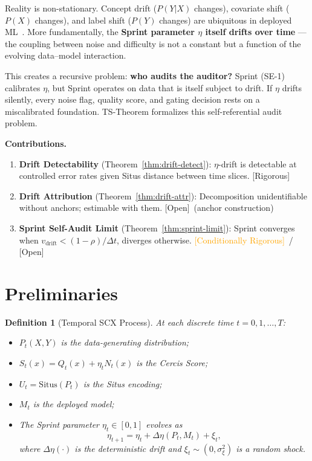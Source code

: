 \documentclass[12pt,a4paper]{article}
\newtheorem{definition}[theorem]{Definition}
\newcommand{\rigorous}{\textcolor{green!50!black}{\small\textsf{[Rigorous]}}}
\newcommand{\conditionallyrigorous}{\textcolor{orange}{\small\textsf{[Conditionally Rigorous]}}}
\newcommand{\openquest}{\textcolor{red!70!black}{\small\textsf{[Open]}}}
\newcommand{\Situs}{\mathrm{Situs}}
\begin{document}
Reality is non-stationary.  Concept drift ($P(Y|X)$ changes), covariate
shift ($P(X)$ changes), and label shift ($P(Y)$ changes) are ubiquitous in
deployed ML~\citep{gama2014survey, lu2018learning}.  More fundamentally,
the \textbf{Sprint parameter $\eta$ itself drifts over time} --- the coupling
between noise and difficulty is not a constant but a function of the
evolving data--model interaction.

This creates a recursive problem: \textbf{who audits the auditor?}  Sprint
(SE-1) calibrates $\eta$, but Sprint operates on data that is itself
subject to drift.  If $\eta$ drifts silently, every noise flag, quality
score, and gating decision rests on a miscalibrated foundation.  TS-Theorem
formalizes this self-referential audit problem.

\medskip\noindent
\textbf{Contributions.}
\begin{enumerate}[label=(\arabic*)]
    \item \textbf{Drift Detectability} (Theorem~\ref{thm:drift-detect}):
          $\eta$-drift is detectable at controlled error rates given Situs
          distance between time slices.  \rigorous
    \item \textbf{Drift Attribution} (Theorem~\ref{thm:drift-attr}):
          Decomposition unidentifiable without anchors; estimable with them.
          \openquest~(anchor construction)
    \item \textbf{Sprint Self-Audit Limit} (Theorem~\ref{thm:sprint-limit}):
          Sprint converges when $v_{\mathrm{drift}} < (1-\rho)/\Delta t$,
          diverges otherwise.  \conditionallyrigorous~/ \openquest
\end{enumerate}

\section{Preliminaries}

\begin{definition}[Temporal SCX Process]
\label{def:temporal}
At each discrete time $t = 0, 1, \dots, T$:
\begin{itemize}
    \item $P_t(X,Y)$ is the data-generating distribution;
    \item $S_t(x) = Q_t(x) + \eta_t N_t(x)$ is the Cercis Score;
    \item $U_t = \Situs(P_t)$ is the Situs encoding;
    \item $M_t$ is the deployed model;
    \item The Sprint parameter $\eta_t \in [0,1]$ evolves as
          \begin{equation}\label{eq:eta-evolution}
              \eta_{t+1} = \eta_t + \Delta\eta(P_t, M_t) + \xi_t,
          \end{equation}
          where $\Delta\eta(\cdot)$ is the deterministic drift and
          $\xi_t \sim (0, \sigma^2_\xi)$ is a random shock.
\end{itemize}
\end{definition}
\end{document}
